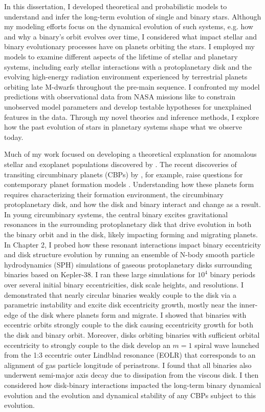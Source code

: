 In this dissertation, I developed theoretical and probabilistic models to understand and infer the long-term evolution of single and binary stars. Although my modeling efforts focus on the dynamical evolution of such systems, e.g. how and why a binary's orbit evolves over time, I considered what impact stellar and binary evolutionary processes have on planets orbiting the stars. I employed my models to examine different aspects of the lifetime of stellar and planetary systems, including early stellar interactions with a protoplanetary disk and the evolving high-energy radiation environment experienced by terrestrial planets orbiting late M-dwarfs throughout the pre-main sequence. I confronted my model predictions with observational data from NASA missions like \kepler to constrain unobserved model parameters and develop testable hypotheses for unexplained features in the data. Through my novel theories and inference methods, I explore how the past evolution of stars in planetary systems shape what we observe today.

Much of my work focused on developing a theoretical explanation for anomalous stellar and exoplanet populations discovered by \kepler. The recent discoveries of transiting circumbinary planets (CBPs) by \kepler, for example, raise questions for contemporary planet formation models \citep[see][]{Welsh2014}.  Understanding how these planets form requires characterizing their formation environment, the circumbinary protoplanetary disk, and how the disk and binary interact and change as a result.  In young circumbinary systems, the central binary excites gravitational resonances in the surrounding protoplanetary disk that drive evolution in both the binary orbit and in the disk, likely impacting forming and migrating planets.  In Chapter 2, I probed how these resonant interactions impact binary eccentricity and disk structure evolution by running an ensemble of N-body smooth particle hydrodynamics (SPH) simulations of gaseous protoplanetary disks surrounding binaries based on Kepler-38. I ran these large simulations for $10^4$ binary periods over several initial binary eccentricities, disk scale heights, and resolutions.  I demonstrated that nearly circular binaries weakly couple to the disk via a parametric instability and excite disk eccentricity growth, mostly near the inner-edge of the disk where planets form and migrate.  I showed that binaries with eccentric orbits strongly couple to the disk causing eccentricity growth for both the disk and binary orbit. Moreover, disks orbiting binaries with sufficient orbital eccentricity to strongly couple to the disk develop an $m = 1$ spiral wave launched from the 1:3 eccentric outer Lindblad resonance (EOLR) that corresponds to an alignment of gas particle longitude of periastrons. I found that all binaries also underwent semi-major axis decay due to dissipation from the viscous disk. I then considered how disk-binary interactions impacted the long-term binary dynamical evolution and the evolution and dynamical stability of any CBPs subject to this evolution. 

